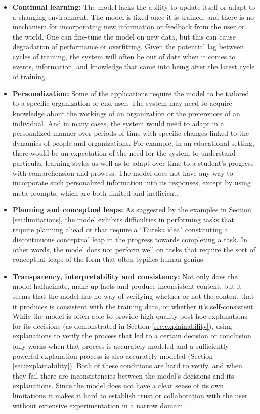 \begin{itemize}
    \item \textbf{Continual learning:} The model lacks the ability to update itself or adapt to a changing environment. The model is fixed once it is trained, and there is no mechanism for incorporating new information or feedback from the user or the world. One can fine-tune the model on new data, but this can cause degradation of performance or overfitting. Given the potential lag between cycles of training, the system will often be out of date when it comes to events, information, and knowledge that came into being after the latest cycle of training.
    \item \textbf{Personalization:} Some of the applications require the model to be tailored to a specific organization or end user. The system may need to acquire knowledge about the workings of an organization or the preferences of an individual. And in many cases, the system would need to adapt in a personalized manner over periods of time with specific changes linked to the dynamics of people and organizations. For example, in an educational setting, there would be an expectation of the need for the system to understand particular learning styles as well as to adapt over time to a student's progress with comprehension and prowess. The model does not have any way to incorporate such personalized information into its responses, except by using meta-prompts, which are both limited and inefficient. 
    \item \textbf{Planning and conceptual leaps:} As suggested by the examples in Section \ref{sec:limitations}, the model exhibits difficulties in performing tasks that require planning ahead or that require a ``Eureka idea" constituting a discontinuous conceptual leap in the progress towards completing a task. In other words, the model does not perform well on tasks that require the sort of conceptual leaps of the form that often typifies human genius.  
    \item \textbf{Transparency, interpretability and consistency:} Not only does the model hallucinate, make up facts and produce inconsistent content, but it seems that the model has no way of verifying whether or not the content that it produces is consistent with the training data, or whether it's self-consistent. While the model is often able to provide high-quality post-hoc explanations for its decisions (as demonstrated in Section \ref{sec:explainability}), using explanations to verify the process that led to a certain decision or conclusion only works when that process is accurately modeled and a sufficiently powerful explanation process is also accurately modeled (Section \ref{sec:explainability}). Both of these conditions are hard to verify, and when they fail there are inconsistencies between the model's decisions and its explanations. Since the model does not have a clear sense of its own limitations it makes it hard to establish trust or collaboration with the user without extensive experimentation in a narrow domain.

\end{itemize}
